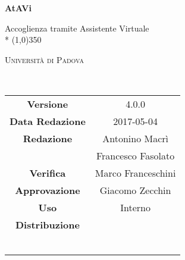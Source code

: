 \documentclass[a4paper,12pt]{article}
\date{2017/05/04}
\begin{document}
\begin{titlepage}
	\centering
	{\huge\bfseries AtAVi\par}
	Accoglienza tramite Assistente Virtuale \\*
	\line(1,0){350} \\
	{\scshape\LARGE Università di Padova \par}
	\vspace{1cm}
	{\scshape\Large \normediprogettoRA\ \par}
	\logo
	\newpage
	\begin{tabular}{c|c}
		{\hfill \textbf{Versione}} 			& 4.0.0								\\
		{\hfill\textbf{Data Redazione}} 	& 2017-05-04 						\\
		{\hfill\textbf{Redazione}} 			& Antonino Macrì \\ & Francesco Fasolato \\
		{\hfill\textbf{Verifica}} 			& Marco Franceschini \\
		{\hfill\textbf{Approvazione}} 		& Giacomo Zecchin	\\
		{\hfill\textbf{Uso}} 				& Interno 							\\
		{\hfill\textbf{Distribuzione}} 		& \vardanega \\ & \cardin \\ & \prop\	\\
	\end{tabular}
\end{titlepage}
	
	\pagestyle{myfront}
	\newpage
		
	\newpage
		\tableofcontents
	
	\label{LastFrontPage}	
		\newpage	
		\pagestyle{mymain}		
			
		\newpage
			
		\newpage		
			
		\newpage		
			
		
	\label{LastPage}
\end{document}
